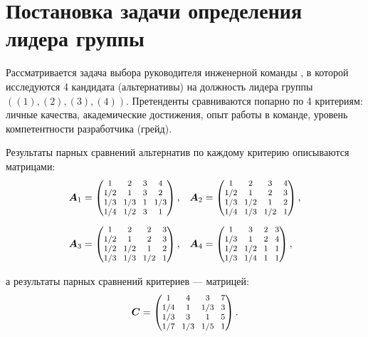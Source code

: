 \documentclass{math-mech-sci}
\begin{document}
\section{Постановка задачи определения лидера группы }

Рассматривается задача выбора руководителя инженерной команды \cite{Teamleader}, в которой исследуются 4 кандидата (альтернативы) на должность лидера группы $((1), (2), (3), (4))$. Претенденты сравниваются попарно по 4 критериям: личные качества, академические достижения, опыт работы в команде, уровень компетентности разработчика (грейд). 

Результаты парных сравнений
альтернатив по каждому критерию описываются матрицами:
$$
\begin{aligned}
\boldsymbol{A}_1 & =
\setlength{\arraycolsep}{3.5pt}
\footnotesize
\begin{pmatrix}
1 & 2 & 3 & 4 \\
1 / 2 & 1 & 3 & 2 \\
1 / 3 & 1 / 3 & 1 & 1 / 3 \\
1 / 4 & 1 / 2 & 3 & 1
\end{pmatrix}, & \boldsymbol{A}_2 & =
\setlength{\arraycolsep}{3.5pt}
\footnotesize
\begin{pmatrix}
1 & 2 & 3 & 4 \\
1 / 2 & 1 & 2 & 3 \\
1 / 3 & 1 / 2 & 1 & 2 \\
1 / 4 & 1 / 3 & 1 / 2 & 1
\end{pmatrix}, \\[1ex]
\boldsymbol{A}_3 & =
\setlength{\arraycolsep}{3.5pt}
\footnotesize
\begin{pmatrix}
1 & 2 & 2 & 3 \\
1 / 2 & 1 & 2 & 3 \\
1 / 2 & 1 / 2 & 1 & 2 \\
1 / 3 & 1 / 3 & 1 / 2 & 1
\end{pmatrix}, & \boldsymbol{A}_4 & =
\setlength{\arraycolsep}{3.5pt}
\footnotesize
\begin{pmatrix}
1 & 3 & 2 & 3 \\
1 / 3 & 1 & 2 & 4 \\
1 / 2 & 1 / 2 & 1 & 1 \\
1 / 3 & 1 / 4 & 1 & 1
\end{pmatrix},
\end{aligned}
$$

а результаты парных сравнений критериев — матрицей:
$$
\boldsymbol{C}=
\setlength{\arraycolsep}{3.5pt}
\footnotesize
\begin{pmatrix}
1 & 4 & 3 & 7 \\
1 / 4 & 1 & 1 / 3 & 3 \\
1 / 3 & 3 & 1 & 5 \\
1 / 7 & 1 / 3 & 1 / 5 & 1
\end{pmatrix}.
$$
\end{document}

